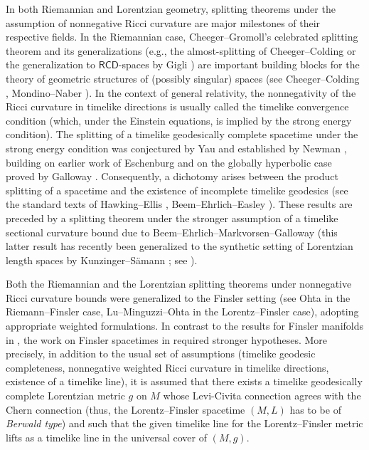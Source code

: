 \documentclass[a4paper,11pt]{article}
\numberwithin{equation}{section}
\theoremstyle{definition}
\theoremstyle{plain}
\begin{document}
In both Riemannian and Lorentzian geometry, splitting theorems under the assumption of nonnegative Ricci curvature are major milestones of their respective fields.
In the Riemannian case, Cheeger--Gromoll's celebrated splitting theorem \cite{CG71} and its generalizations (e.g., the almost-splitting of Cheeger--Colding \cite{CheegerColding96} or the generalization to $\mathsf{RCD}$-spaces by Gigli \cite{gigli2013}) are important building blocks for the theory of geometric structures of (possibly singular) spaces (see Cheeger--Colding \cite{CC97}, Mondino--Naber \cite{MondinoNaber2019}).
In the context of general relativity, the nonnegativity of the Ricci curvature in timelike directions is usually called the timelike convergence condition (which, under the Einstein equations, is implied by the strong energy condition).  The splitting of a timelike geodesically complete spacetime under the strong energy condition  was conjectured by Yau \cite{Yau82} and established by Newman \cite{Newman:90}, building on earlier work of Eschenburg \cite{Eschenburg:1988} and on the globally hyperbolic case proved by Galloway \cite{Galloway:89}.  Consequently, a  dichotomy arises between the product splitting of a spacetime and the existence of incomplete timelike  geodesics (see the standard texts of Hawking--Ellis \cite{HawkingEllisAnniv2023}, Beem--Ehrlich--Easley \cite{BEE:1996}).
These results are preceded by a splitting theorem under the stronger assumption of a timelike sectional curvature bound due to Beem--Ehrlich--Markvorsen--Galloway \cite{BeemEhrlichMarkvorsenGalloway84, BEMG85} (this latter result has recently been generalized to the synthetic setting of Lorentzian length spaces by Kunzinger--Sämann \cite{KS:18}; see  \cite{BeranOhanyanRottSolis23}).

Both the Riemannian and the Lorentzian splitting theorems under nonnegative Ricci curvature bounds were generalized to the Finsler setting (see Ohta \cite{Osplit} in the Riemann--Finsler case, Lu--Minguzzi--Ohta \cite{LMO3} in the Lorentz--Finsler case), adopting appropriate weighted formulations.
In contrast to the results for Finsler manifolds in \cite{Osplit}, the work on Finsler spacetimes in \cite{LMO3} required stronger hypotheses. More precisely, in addition to the usual set of assumptions (timelike geodesic completeness, nonnegative weighted Ricci curvature in timelike directions, existence of a timelike line), it is  assumed that there exists a timelike geodesically complete Lorentzian metric $g$ on $M$ whose Levi-Civita connection agrees with the Chern connection (thus, the Lorentz--Finsler spacetime $(M,L)$ has  to be  of {\em Berwald type})  and  such that  the given timelike line for the Lorentz--Finsler metric lifts as a timelike line in the  universal cover of $(M,g)$. 
\end{document}
